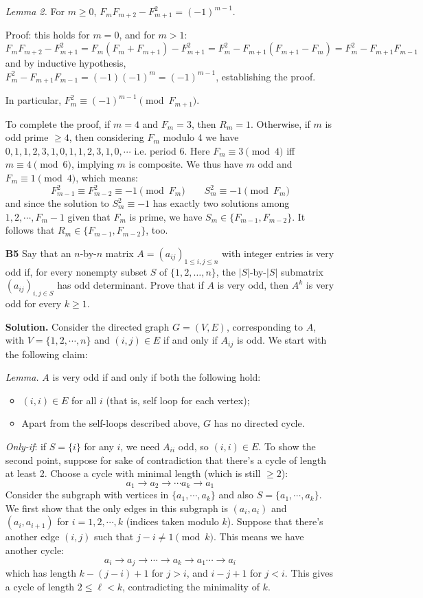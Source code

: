 \documentclass[11pt,a4paper]{article}
\newcommand{\<}{\langle}
\renewcommand{\>}{\rangle}
\begin{document}
\begin{enumerate}
    \emph{Lemma 2.} For $m\ge 0$, $F_mF_{m+2}-F_{m+1}^2=(-1)^{m-1}$. 
    
    Proof: this holds for $m=0$, and for $m>1$: 
    \[
    F_mF_{m+2}-F_{m+1}^2
    =F_m(F_m+F_{m+1}) - F_{m+1}^2
    =F_m^2-F_{m+1}(F_{m+1}-F_m)
    =F_m^2-F_{m+1}F_{m-1}
    \]
    and by inductive hypothesis, $F_m^2-F_{m+1}F_{m-1}=(-1)(-1)^{m}=(-1)^{m-1}$, establishing the proof. 
    
    In particular, $F_m^2\equiv (-1)^{m-1}\pmod{F_{m+1}}$. 
    
    To complete the proof, if $m=4$ and $F_m=3$, then $R_m=1$. 
    Otherwise, if $m$ is odd prime $\ge 4$, then considering $F_m$ modulo 4 we have 
    $0, 1, 1, 2, 3, 1, 0, 1, 1, 2, 3, 1, 0, \cdots$ i.e. period 6. 
    Here $F_m\equiv 3\pmod{4}$ iff $m\equiv 4\pmod{6}$, implying $m$ is composite. 
    We thus have $m$ odd and $F_m\equiv 1\pmod{4}$, which means: 
    \[
    F_{m-1}^2\equiv F_{m-2}^2\equiv -1\pmod{F_m}\qquad S_m^2\equiv -1 \pmod{F_m}
    \]
    and since the solution to $S_m^2\equiv -1$ has exactly two solutions among $1, 2, \cdots, F_m-1$ given that $F_m$ is prime, 
    we have $S_m\in \{F_{m-1}, F_{m-2}\}$. It follows that $R_m\in \{F_{m-1}, F_{m-2}\}$, too. 
	
	\item [\textbf{B5}] 
	Say that an $n$-by-$n$ matrix $A=(a_{ij})_{1\le i,j \le n}$ with integer entries is very odd if, for every nonempty subset $S$ of $\{1,2,\dots,n \}$, the $|S|$-by-$|S|$ submatrix $(a_{ij})_{i,j \in S}$ has odd determinant. Prove that if $A$ is very odd, then $A^k$ is very odd for every $k \ge 1$.
	
	\textbf{Solution.} Consider the directed graph $G=(V, E)$, corresponding to $A$, 
	with $V=\{1, 2, \cdots, n\}$ and $(i, j)\in E$ if and only if $A_{ij}$ is odd. 
	We start with the following claim: 
	
	\emph{Lemma.} $A$ is very odd if and only if both the following hold: 
	\begin{itemize}
		\item $(i, i)\in E$ for all $i$ (that is, self loop for each vertex); 
		
		\item Apart from the self-loops described above, $G$ has no directed cycle. 
	\end{itemize}
	
	\emph{Only-if}: if $S=\{i\}$ for any $i$, we need $A_{ii}$ odd, so $(i, i)\in E$. 
	To show the second point, suppose for sake of contradiction that there's a cycle of length at least 2. 
	Choose a cycle with minimal length (which is still $\ge 2$): 
	\[
	a_1\to a_2\to \cdots a_k\to a_1
	\]
	Consider the subgraph with vertices in $\{a_1, \cdots, a_k\}$ and also $S=\{a_1, \cdots, a_k\}$. 
	We first show that the only edges in this subgraph is $(a_i, a_i)$ and $(a_i, a_{i+1})$ for $i=1, 2, \cdots, k$ (indices taken modulo $k$). 
	Suppose that there's another edge $(i, j)$ such that $j-i\neq 1\pmod{k}$. 
	This means we have another cycle: 
	\[
	a_i\to a_j\to \cdots \to a_{k}\to a_1\cdots \to a_i
	\]
	which has length $k-(j-i)+1$ for $j>i$, and $i-j+1$ for $j<i$. This gives a cycle of length $2\le \ell < k$, contradicting the minimality of $k$. 
	

\end{enumerate}
\end{document}
